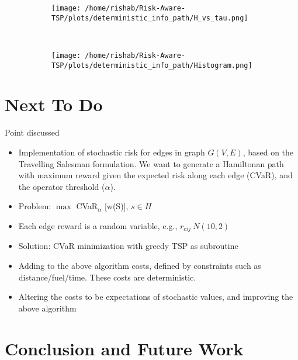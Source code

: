 \documentclass[conference]{IEEEtran}
\begin{document}
\begin{figure}
\begin{center}
\begin{subfigure}{0.5\textwidth}
    \texttt{[image: /home/rishab/Risk-Aware-TSP/plots/deterministic\_info\_path/H\_vs\_tau.png]}
    \caption{}
  \end{subfigure}%
\end{center}
  \hspace*{\fill}   %
  \\
  \begin{center}
   \begin{subfigure}{0.5\textwidth}
    \texttt{[image: /home/rishab/Risk-Aware-TSP/plots/deterministic\_info\_path/Histogram.png]}
    \caption{}
  \end{subfigure}%
  \end{center}
  \hspace*{\fill}   %
\caption{}
\end{figure}

\section{Next To Do}
Point discussed
\begin{itemize}
    \item Implementation of stochastic risk for edges in graph $G(V,E)$, based on the Travelling Salesman formulation. We want to generate a Hamiltonan path with maximum reward given the expected risk along each edge (CVaR), and the operator threshold ($\alpha$).  
    
    \item Problem: $\max$ CVaR$_\alpha$ [w(S)], $s \in H$ 

    \item Each edge reward is a random variable, e.g., $r_{eij} ~ N(10, 2)$
    
    \item Solution: CVaR minimization with greedy TSP as subroutine 
    

\item Adding to the above algorithm costs, defined by constraints such as distance/fuel/time. These costs are deterministic. 

\item Altering the costs to be expectations of stochastic values, and improving the above algorithm
\end{itemize}

\section{Conclusion and Future Work}
\end{document}
